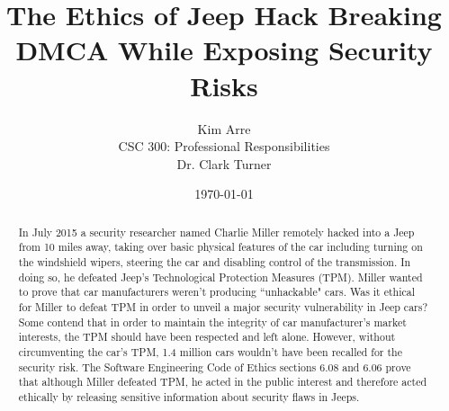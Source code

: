 \documentclass[12pt]{article}
\begin{document}

\title{\vfill The Ethics of Jeep Hack Breaking DMCA While Exposing Security Risks} %
\author{
  Kim Arre \vspace{10pt} \\
  CSC 300: Professional Responsibilities  \vspace{10pt} \\
  Dr. Clark Turner \vspace{10pt} \\
}
\date{\today}

\maketitle

\vfill  %
\begin{abstract}
In July 2015 a security researcher named Charlie Miller remotely hacked into a Jeep from 10 miles away, taking over basic physical features of the car including turning on the windshield wipers, steering the car and disabling control of the transmission.\cite{wired} In doing so, he defeated Jeep's Technological Protection Measures (TPM). Miller wanted to prove that car manufacturers weren't producing ``unhackable" cars.\cite{youtube} Was it ethical for Miller to defeat TPM in order to unveil a major security vulnerability in Jeep cars? Some contend that in order to maintain the integrity of car manufacturer's market interests, the TPM should have been respected and left alone. However, without circumventing the car's TPM, 1.4 million cars wouldn't have been recalled for the security risk.\cite{recall} The Software Engineering Code of Ethics sections 6.08 and 6.06 prove that although Miller defeated TPM, he acted in the public interest and therefore acted ethically by releasing sensitive information about security flaws in Jeeps.\cite{peer}
\end{abstract}

\thispagestyle{empty} %
\newpage
\end{document}
